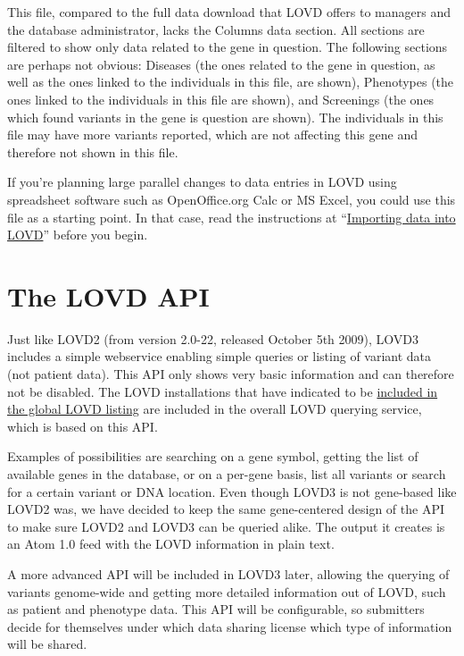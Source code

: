 \documentclass[a4paper,oneside,openany,12pt]{memoir}
\begin{document}
This file, compared to the full data download that LOVD offers to managers and the database administrator, lacks the Columns data section.
All sections are filtered to show only data related to the gene in question.
The following sections are perhaps not obvious: Diseases (the ones related to the gene in question, as well as the ones linked to the individuals in this file, are shown),
 Phenotypes (the ones linked to the individuals in this file are shown), and Screenings (the ones which found variants in the gene is question are shown).
The individuals in this file may have more variants reported, which are not affecting this gene and therefore not shown in this file.

If you're planning large parallel changes to data entries in LOVD using spreadsheet software such as OpenOffice.org Calc or MS Excel, you could use this file as a starting point.
In that case, read the instructions at ``\hyperlink{sec:download_importing_data}{Importing data into LOVD}'' before you begin.
\clearpage %










\chapter{The LOVD API}
Just like LOVD2 (from version 2.0-22, released October 5th 2009), LOVD3 includes a simple
 webservice enabling simple queries or listing of variant data (not patient data).
This API only shows very basic information and can therefore not be disabled.
The LOVD installations that have indicated to be \hyperlink{item:include_in_listing}{included in the
 global LOVD listing} are included in the overall LOVD querying service, which is based on this API.

Examples of possibilities are searching on a gene symbol, getting the list of available genes in the database,
 or on a per-gene basis, list all variants or search for a certain variant or DNA location.
Even though LOVD3 is not gene-based like LOVD2 was, we have decided to keep the same
 gene-centered design of the API to make sure LOVD2 and LOVD3 can be queried alike.
The output it creates is an Atom 1.0 feed with the LOVD information in plain text.

A more advanced API will be included in LOVD3 later, allowing the querying of variants genome-wide
 and getting more detailed information out of LOVD, such as patient and phenotype data.
This API will be configurable, so submitters decide for themselves under
 which data sharing license which type of information will be shared.
\end{document}
